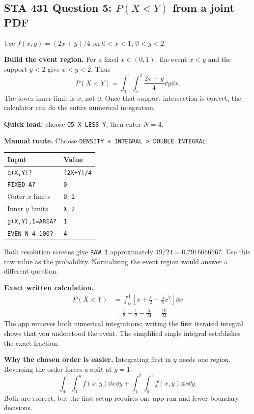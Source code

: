 \clearpage
\subsection{STA 431 Question 5: \texorpdfstring{$P(X<Y)$}{P(X<Y)} from a joint PDF}
Use $f(x,y)=(2x+y)/4$ on $0<x<1$, $0<y<2$.

\textbf{Build the event region.} For a fixed $x\in(0,1)$, the event $x<y$ and the support $y<2$ give $x<y<2$. Thus
\[
P(X<Y)=\int_0^1\int_x^2\frac{2x+y}{4}\dd y\dd x.
\]
The lower inner limit is $x$, not 0. Once that support intersection is correct, the calculator can do the entire numerical integration.

\textbf{Quick load:} choose \texttt{Q5 X LESS Y}, then enter $N=4$.\par
\textbf{Manual route.} Choose \texttt{DENSITY + INTEGRAL > DOUBLE INTEGRAL}:
\begin{center}
\begin{tabular}{@{}ll@{}}
\toprule Input & Value\\\midrule
\texttt{q(X,Y)?} & \texttt{(2X+Y)/4}\\
\texttt{FIXED A?} & \texttt{0}\\
Outer $x$ limits & \texttt{0}, \texttt{1}\\
Inner $y$ limits & \texttt{X}, \texttt{2}\\
\texttt{g(X,Y),1=AREA?} & \texttt{1}\\
\texttt{EVEN N 4-100?} & \texttt{4}\\\bottomrule
\end{tabular}
\end{center}
Both resolution screens give \texttt{RAW I} approximately $19/24=0.7916666667$. Use this raw value as the probability. Normalizing the event region would answer a different question.

\textbf{Exact written calculation.}
\[
\begin{aligned}
P(X<Y)
&=\int_0^1\left[x+\frac12-\frac58x^2\right]\dd x\\
&=\frac12+\frac12-\frac5{24}
=\boxed{\frac{19}{24}}.
\end{aligned}
\]
The app removes both numerical integrations; writing the first iterated integral shows that you understood the event. The simplified single integral establishes the exact fraction.

\textbf{Why the chosen order is easier.} Integrating first in $y$ needs one region. Reversing the order forces a split at $y=1$:
\[
\int_0^1\int_0^y f(x,y)\dd x\dd y
+\int_1^2\int_0^1 f(x,y)\dd x\dd y.
\]
Both are correct, but the first setup requires one app run and fewer boundary decisions.

